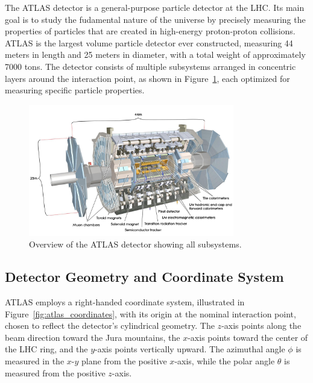 The ATLAS detector is a general-purpose particle detector at the LHC. Its main goal is to study the fudamental nature of the universe by precisely measuring the properties of particles that are created in high-energy proton-proton collisions. ATLAS is the largest volume particle detector ever constructed, measuring 44 meters in length and 25 meters in diameter, with a total weight of approximately 7000 tons. The detector consists of multiple subsystems arranged in concentric layers around the interaction point, as shown in Figure~\ref{fig:atlas_detector}, each optimized for measuring specific particle properties.

\begin{figure}[!htb]
\begin{center}
\includegraphics[width=0.8\textwidth]{figures/ATLAS_detector_0803012_01.jpg}\caption{Overview of the ATLAS detector showing all subsystems.} %
\label{fig:atlas_detector}
\end{center}
\end{figure}

\subsection{Detector Geometry and Coordinate System}

ATLAS employs a right-handed coordinate system, illustrated in Figure~\ref{fig:atlas_coordinates}, with its origin at the nominal interaction point, chosen to reflect the detector's cylindrical geometry. The $z$-axis points along the beam direction toward the Jura mountains, the $x$-axis points toward the center of the LHC ring, and the $y$-axis points vertically upward. The azimuthal angle $\phi$ is measured in the $x$-$y$ plane from the positive $x$-axis, while the polar angle $\theta$ is measured from the positive $z$-axis.

